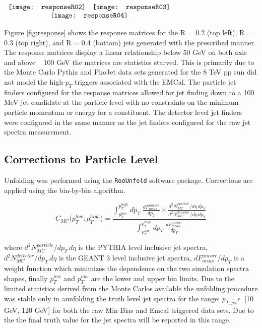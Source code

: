 \begin{figure*}[t!]
$\begin{array}{rl}
    \texttt{[image: responseR02]} &
    \texttt{[image: responseR03]}\\
    \multicolumn{2}{c}{\texttt{[image: responseR04]}}
\end{array}$
\caption[Response Matrices for R = 0.2, R=0.3, and R = 0.4 jets.]{\label{fig:response}Response Matrices for R = 0.2, R=0.3, and R = 0.4 jets.}
\end{figure*}

Figure \ref{fig:response} shows the response matrices for the R = 0.2 (top left), R = 0.3 (top right), and R = 0.4 (bottom) jets generated with the prescribed manner.  The response matrices display a linear relationship below 50 GeV on both axis and above ~ 100 GeV the matrices are statistics starved.  This is primarily due to the Monte Carlo Pythia and PhoJet data sets generated for the 8 TeV pp run did not model the high-$p_{T}$ triggers associated with the EMCal.  The particle jet finders configured for the response matrices allowed for jet finding down to a 100 MeV jet candidate at the particle level with no constraints on the minimum particle momentum or energy for a constituent.  The detector level jet finders were configured in the same manner as the jet finders configured for the raw jet spectra measurement.  

\subsection{Corrections to Particle Level}

Unfolding was performed using the \verb+RooUnfold+\cite{Adye:2011gm} software package.  Corrections are applied using the bin-by-bin\cite{Cowan:2002in} algorithm. 

\begin{equation}
C_{MC} \big( p_{T}^{low} : p_{T}^{high} \big) =  \frac{  \int^{p_{T}^{high}}_{p_{T}^{low}} dp_{T} \; \frac{dF^{uncorr}_{meas}}{dp_{T}} \times \frac{d^{2}N^{particle}_{MC}/d\eta \, dp_{T}}{d^{2}N^{detector}_{MC}/d\eta \, dp_{T}}  } { \int^{p_{T}^{high}}_{p_{T}^{low}} dp_{T} \; \frac{dF^{uncorr}_{meas}}{dp_{T}} }
\label{eq:binbybin}
\end{equation}

\noindent
where $d^{2}N^{particle}_{MC}/dp_{T} \, d\eta$ is the PYTHIA level inclusive jet spectra, $d^{2}N^{detector}_{MC}/dp_{T} \, d\eta$ is the GEANT 3 level inclusive jet spectra, $dF^{uncorr}_{meas} / dp_{T}$ is a weight function which minimizes the dependence on the two simulation spectra shapes, finally $p_{T}^{low}$ and $p_{T}^{low}$ are the lower and upper bin limits.  Due to the limited statistics derived from the Monte Carlos available the unfolding procedure was stable only in aunfolding the truth level jet spectra for the range: $p_{T,jet} \epsilon \;$ [10 GeV, 120 GeV] for both the raw Min Bias and Emcal triggered data sets.  Due to the  the final truth value for the jet spectra will be reported in this range.



